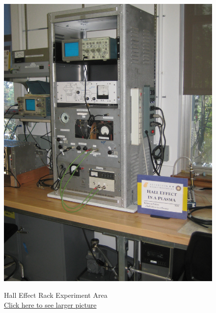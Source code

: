 \documentclass{../lab}
\begin{document}
\begin{figure}[H]
  \href{http://experimentationlab.berkeley.edu/sites/default/files/images/HAL_3510.jpg}{\includegraphics[width=\linewidth,keepaspectratio]{images/HAL_3510.jpg}}
  \caption{Hall Effect Rack Experiment Area \\ \href{http://experimentationlab.berkeley.edu/sites/default/files/images/HAL_3510.jpg}{Click here to see larger picture}}\label{fig:HAL_Plasma_3510.jpg}
\endminipage\hfill
{}

\end{figure}
\end{document}
